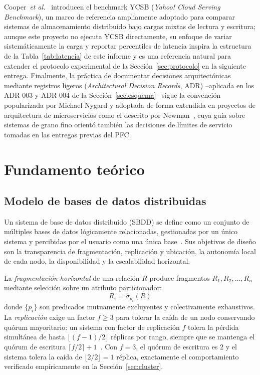\documentclass[10pt,twocolumn]{article}
\begin{document}
Cooper~\emph{et al.}~\cite{cooper2010ycsb} introducen el benchmark YCSB
(\emph{Yahoo! Cloud Serving Benchmark}), un marco de referencia ampliamente
adoptado para comparar sistemas de almacenamiento distribuido bajo cargas
mixtas de lectura y escritura; aunque este proyecto no ejecuta YCSB
directamente, su enfoque de variar sistemáticamente la carga y reportar
percentiles de latencia inspira la estructura de la Tabla~\ref{tab:latencia}
de este informe y es una referencia natural para extender el protocolo
experimental de la Sección~\ref{sec:protocolo} en la siguiente entrega.
Finalmente, la práctica de documentar decisiones arquitectónicas mediante
registros ligeros (\emph{Architectural Decision Records}, ADR) --aplicada
en los ADR-003 y ADR-004 de la Sección~\ref{sec:esquema}-- sigue la
convención popularizada por Michael Nygard y adoptada de forma extendida en
proyectos de arquitectura de microservicios como el descrito por
Newman~\cite{newman2015microservices}, cuya guía sobre sistemas de grano fino orientó
también las decisiones de límites de servicio tomadas en las entregas
previas del PFC.

\section{Fundamento teórico}
\label{sec:teoria}

\subsection{Modelo de bases de datos distribuidas}

Un sistema de base de datos distribuido (SBDD) se define como un conjunto
de múltiples bases de datos lógicamente relacionadas, gestionadas por un
único sistema y percibidas por el usuario como una única base~\cite{ozsu2020}.
Sus objetivos de diseño son la transparencia de fragmentación, replicación
y ubicación, la autonomía local de cada nodo, la disponibilidad y la
escalabilidad horizontal.

La \emph{fragmentación horizontal} de una relación $R$ produce fragmentos
$R_1, R_2, \ldots, R_n$ mediante selección sobre un atributo particionador:
\begin{equation}
R_i = \sigma_{p_i}(R)
\label{eq:fragmentacion}
\end{equation}
donde $\{p_i\}$ son predicados mutuamente excluyentes y colectivamente
exhaustivos. La \emph{replicación} exige un factor $f \geq 3$ para tolerar
la caída de un nodo conservando quórum mayoritario: un sistema con factor
de replicación $f$ tolera la pérdida simultánea de hasta
$\lfloor (f-1)/2 \rfloor$ réplicas por rango, siempre que se mantenga el
quórum de escritura $\lceil f/2 \rceil + 1$~\cite{huang2020tidb,taft2020}. Con
$f=3$, el quórum de escritura es $2$ y el sistema tolera la caída de
$\lfloor 2/2 \rfloor = 1$ réplica, exactamente el comportamiento verificado
empíricamente en la Sección~\ref{sec:cluster}.
\end{document}
